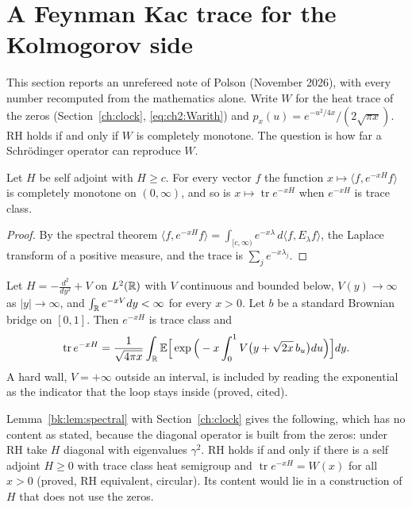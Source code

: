 \section{A Feynman Kac trace for the Kolmogorov side}\label{bk:sec:fk}

This section reports an unrefereed note of Polson (November 2026), with every number recomputed from the mathematics alone. Write $W$ for the heat trace of the zeros (Section~\ref{ch:clock}, \eqref{eq:ch2:Warith}) and $p_x(u)=e^{-u^2/4x}/(2\sqrt{\pi x})$. RH holds if and only if $W$ is completely monotone. The question is how far a Schr\"odinger operator can reproduce $W$.

\begin{lemma}\label{bk:lem:spectral}
Let $H$ be self adjoint with $H\ge c$. For every vector $f$ the function $x\mapsto\langle f,e^{-xH}f\rangle$ is completely monotone on $(0,\infty)$, and so is $x\mapsto\operatorname{tr}e^{-xH}$ when $e^{-xH}$ is trace class.
\end{lemma}

\begin{proof}
By the spectral theorem $\langle f,e^{-xH}f\rangle=\int_{[c,\infty)}e^{-x\lambda}\,d\langle f,E_\lambda f\rangle$, the Laplace transform of a positive measure, and the trace is $\sum_je^{-x\lambda_j}$.
\end{proof}

\begin{theorem}\label{bk:thm:fktrace}
Let $H=-\frac{d^2}{dy^2}+V$ on $L^2(\mathbb{R})$ with $V$ continuous and bounded below, $V(y)\to\infty$ as $|y|\to\infty$, and $\int_{\mathbb{R}}e^{-xV}dy<\infty$ for every $x>0$. Let $b$ be a standard Brownian bridge on $[0,1]$. Then $e^{-xH}$ is trace class and
\[
\operatorname{tr}e^{-xH}=\frac1{\sqrt{4\pi x}}\int_{\mathbb{R}}\mathbb{E}\Big[\exp\Big(-x\int_0^1V\big(y+\sqrt{2x}\,b_u\big)du\Big)\Big]dy.
\]
A hard wall, $V=+\infty$ outside an interval, is included by reading the exponential as the indicator that the loop stays inside (proved, cited).
\end{theorem}

Lemma~\ref{bk:lem:spectral} with Section~\ref{ch:clock} gives the following, which has no content as stated, because the diagonal operator is built from the zeros: under RH take $H$ diagonal with eigenvalues $\gamma^2$. RH holds if and only if there is a self adjoint $H\ge0$ with trace class heat semigroup and $\operatorname{tr}e^{-xH}=W(x)$ for all $x>0$ (proved, RH equivalent, circular). Its content would lie in a construction of $H$ that does not use the zeros.


